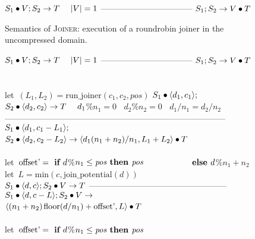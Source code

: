 \begin{figure}[t]
$S_1 \bullet V; S_2 \rightarrow T~~~~|V|=1$\skiptopb
---------------------------------\skipbot
$S_1; S_2 \rightarrow V \bullet T$
\caption{Semantics of \textsc{Joiner}: execution of a roundrobin
  joiner in the uncompressed domain.
\protect\label{fig:uncompressed-joiner}}
\end{figure}

\begin{figure}
$S_1 \bullet V; S_2 \rightarrow T~~~~|V|=1$\skiptopb
---------------------------------\skipbot
$S_1; S_2 \rightarrow V \bullet T$
~ \\ ~ \\
let~$(L_1, L_2) = \mbox{run\_joiner}(c_1, c_2, pos)$\skiptopb
$S_1 \bullet \langle d_1, c_1\rangle;$\\
$S_2 \bullet \langle d_2, c_2\rangle \rightarrow T~~~~d_1$\%$n_1=0~~~~d_2$\%$n_2=0~~~~d_1/n_1=d_2/n_2$\vspace{-3pt}\skiptopa
--------------------------------------------------------------------------------\skipbot
$S_1 \bullet \langle d_1, c_1-L_1\rangle;$\\
$S_2 \bullet \langle d_2, c_2-L_2\rangle \rightarrow \langle d_1(n_1+n_2)/n_1, L_1+L_2\rangle \bullet T$
~ \\ ~ \\
let~$\mbox{offset'} = \mbox{\bf ~if~} d$\%$n_1 \leq \mbox{\it pos} \mbox{\bf ~then~} \mbox{\it pos}$\skiptopb
$\mbox{~~~~}\hspace{37.7pt}\mbox{\bf ~else~} d$\%$n_1 + n_2$\\
let~$L=\mbox{min}(c,\mbox{join\_potential}(d))$\\
$S_1 \bullet \langle d, c\rangle; S_2 \bullet V \rightarrow T$\vspace{-3pt}\skiptopa
--------------------------------------------------\skipbot
$S_1 \bullet \langle d, c-L\rangle; S_2 \bullet V \rightarrow$\\
$\langle(n_1 + n_2){\hspace{1.3pt}}\mbox{floor}(d/n_1) + \mbox{offset'}, L\rangle \bullet T$
~ \\ ~ \\
let~$\mbox{offset'} = \mbox{\bf ~if~} d$\%$n_1 \leq \mbox{\it pos} \mbox{\bf ~then~} \mbox{\it pos}$\skiptopb

\end{figure}
